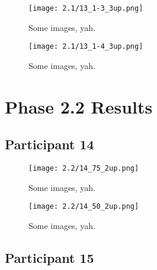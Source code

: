 \begin{figure}[h]
	\begin{center}
	\texttt{[image: 2.1/13\_1-3\_3up.png]}
	\caption{Some images, yah.}
	\end{center}
\end{figure}

\clearpage

\begin{figure}[h]
	\begin{center}
	\texttt{[image: 2.1/13\_1-4\_3up.png]}
	\caption{Some images, yah.}
	\end{center}
\end{figure}


\clearpage

\section{Phase 2.2 Results}


\clearpage

\subsection{Participant 14}

\begin{figure}[h]
	\begin{center}
	\texttt{[image: 2.2/14\_75\_2up.png]}
	\caption{Some images, yah.}
	\end{center}
\end{figure}

\clearpage

\begin{figure}[h]
	\begin{center}
	\texttt{[image: 2.2/14\_50\_2up.png]}
	\caption{Some images, yah.}
	\end{center}
\end{figure}


\clearpage

\subsection{Participant 15}

